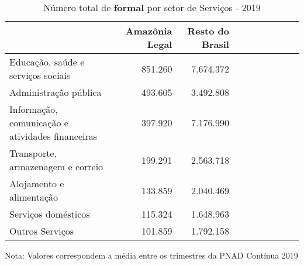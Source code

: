 \begin{table}[H]
\centering
\label{\_retrato\_emprego\_setor\_gape\_table\_n\_de\_formal}
\begin{threeparttable}
\caption{Número total de \textbf{formal} por setor de Serviços - 2019}
\begin{tabular}{l*{3}{rrr}}
\midrule \midrule
                    &Amazônia Legal&Resto do Brasil\\
\midrule
Educação, saúde e serviços sociais&     851.260&   7.674.372\\
Administração pública&     493.605&   3.492.808\\
Informação, comunicação e atividades financeiras&     397.920&   7.176.990\\
Transporte, armazenagem e correio&     199.291&   2.563.718\\
Alojamento e alimentação&     133.859&   2.040.469\\
Serviços domésticos&     115.324&   1.648.963\\
Outros Serviços    &     101.859&   1.792.158\\
\bottomrule
\end{tabular}
\begin{tablenotes}
\scriptsize{Nota: Valores correspondem a média entre os trimestres da PNAD Contínua 2019}
\end{tablenotes}
\end{threeparttable}
\end{table}
